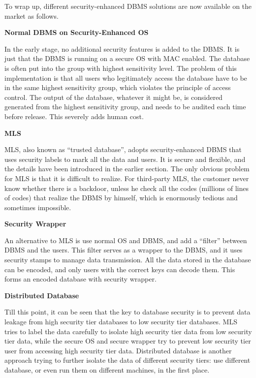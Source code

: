 To wrap up, different security-enhanced DBMS solutions are now available on the market as follows.

\vspace{0.1in}
\noindent \textbf{Normal DBMS on Security-Enhanced OS}
\vspace{0.1in}

In the early stage, no additional security features is added to the DBMS. It is just that the DBMS is running on a secure OS with MAC enabled. The database is often put into the group with highest sensitivity level. The problem of this implementation is that all users who legitimately access the database have to be in the same highest sensitivity group, which violates the principle of access control. The output of the database, whatever it might be, is considered generated from the highest sensitivity group, and needs to be audited each time before release. This severely adds human cost.

\vspace{0.1in}
\noindent \textbf{MLS}
\vspace{0.1in}

MLS, also known as ``trusted database'', adopts security-enhanced DBMS that uses security labels to mark all the data and users. It is secure and flexible, and the details have been introduced in the earlier section. The only obvious problem for MLS is that it is difficult to realize. For third-party MLS, the customer never know whether there is a backdoor, unless he check all the codes (millions of lines of codes) that realize the DBMS by himself, which is enormously tedious and sometimes impossible.

\vspace{0.1in}
\noindent \textbf{Security Wrapper}
\vspace{0.1in}

An alternative to MLS is use normal OS and DBMS, and add a ``filter'' between DBMS and the users. This filter serves as a wrapper to the DBMS, and it uses security stamps to manage data transmission. All the data stored in the database can be encoded, and only users with the correct keys can decode them. This forms an encoded database with security wrapper.

\vspace{0.1in}
\noindent \textbf{Distributed Database}
\vspace{0.1in}

Till this point, it can be seen that the key to database security is to prevent data leakage from high security tier databases to low security tier databases. MLS tries to label the data carefully to isolate high security tier data from low security tier data, while the secure OS and secure wrapper try to prevent low security tier user from accessing high security tier data. Distributed database is another approach trying to further isolate the data of different security tiers: use different database, or even run them on different machines, in the first place.

